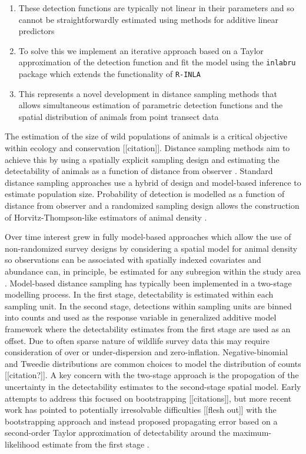 \documentclass[preprint,12pt]{elsarticle}
\begin{document}
\begin{enumerate}
	\item  These detection functions are typically not linear in their parameters and so cannot be straightforwardly estimated using methods for additive linear predictors
	\item To solve this we implement an iterative approach based on a Taylor approximation of the detection function and fit the model using the \texttt{inlabru} package which extends the functionality of \texttt{R-INLA}
	\item This represents a novel development in distance sampling methods that allows simultaneous estimation of parametric detection functions and the spatial distribution of animals from point transect data
\end{enumerate}

The estimation of the size of wild populations of animals is a critical objective within ecology and conservation [[citation]].  Distance sampling methods aim to achieve this by using a spatially explicit sampling design and estimating the detectability of animals as a function of distance from observer \citep{buckland_advanced_2008, buckland_distance_2015}.  Standard distance sampling approaches use a hybrid of design and model-based inference to estimate population size.  Probability of detection is modelled as a function of distance from observer and a randomized sampling design allows the construction of Horvitz-Thompson-like estimators of animal density \citep{horvitz_generalization_1952,  buckland_advanced_2008}.

Over time interest grew in fully model-based approaches which allow the use of non-randomized survey designs by considering a spatial model for animal density so observations can be associated with spatially indexed covariates and abundance can, in principle, be estimated for any subregion within the study area \citep{johnson_model-based_2010, buckland_model-based_2016, miller_spatial_2013}.  Model-based distance sampling has typically been implemented in a two-stage modelling process.  In the first stage, detectability is estimated within each sampling unit.  In the second stage, detections within sampling units are binned into counts and used as the response variable in generalized additive model framework where the detectability estimates from the first stage are used as an offset.  Due to often sparse nature of wildlife survey data this may require consideration of over or under-dispersion and zero-inflation.  Negative-binomial and Tweedie distributions are common choices to model the distribution of counts [[citation?]].  
A key concern with the two-stage approach is the propogation of the uncertainty in the detectability estimates to the second-stage spatial model.  Early attempts to address this focused on bootstrapping [[citations]], but more recent work has pointed to potentially irresolvable difficulties  [[flesh out]] with the bootstrapping approach and instead proposed propagating error based on a second-order Taylor approximation of detectability around the maximum-likelihood estimate from the first stage \citep{bravington_reliable_2018-1}.
\end{document}
